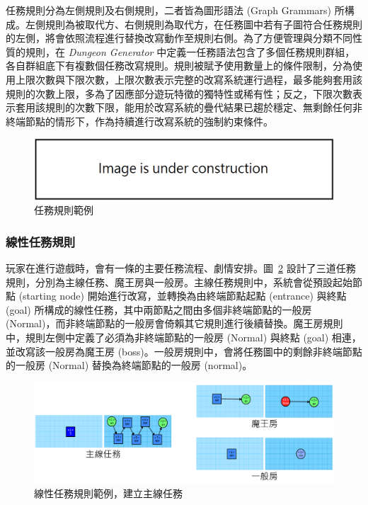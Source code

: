 任務規則分為左側規則及右側規則，二者皆為圖形語法 (Graph Grammars) 所構成。左側規則為被取代方、右側規則為取代方，在任務圖中若有子圖符合任務規則的左側，將會依照流程進行替換改寫動作至規則右側。為了方便管理與分類不同性質的規則，在 \textit{Dungeon Generator} 中定義一任務語法包含了多個任務規則群組，各自群組底下有複數個任務改寫規則。規則被賦予使用數量上的條件限制，分為使用上限次數與下限次數，上限次數表示完整的改寫系統運行過程，最多能夠套用該規則的次數上限，多為了因應部分遊玩特徵的獨特性或稀有性；反之，下限次數表示套用該規則的次數下限，能用於改寫系統的疊代結果已趨於穩定、無剩餘任何非終端節點的情形下，作為持續進行改寫系統的強制約束條件。

\begin{figure}[ht]
  \begin{center}
    \includegraphics[width=1.0\textwidth]{figures/under_construction.png}
    \caption{任務規則範例}
    \label{fig:missiongrammars-tutorial}
  \end{center}
\end{figure}

\subsubsection{線性任務規則}
\label{sssec:method-missiongrammars-rules-linearrules}

玩家在進行遊戲時，會有一條的主要任務流程、劇情安排。圖~\ref{fig:missiongrammars-rules-linear-example} 設計了三道任務規則，分別為主線任務、魔王房與一般房。主線任務規則中，系統會從預設起始節點 (starting node) 開始進行改寫，並轉換為由終端節點起點 (entrance) 與終點 (goal) 所構成的線性任務，其中兩節點之間由多個非終端節點的一般房 (Normal)，而非終端節點的一般房會倚賴其它規則進行後續替換。魔王房規則中，規則左側中定義了必須為非終端節點的一般房 (Normal) 與終點 (goal) 相連，並改寫該一般房為魔王房 (boss)。一般房規則中，會將任務圖中的剩餘非終端節點的一般房 (Normal) 替換為終端節點的一般房 (normal)。

\begin{figure}[ht]
  \begin{center}
    \includegraphics[width=1.0\textwidth]{figures/missiongrammars-rules-linear-example.png}
    \caption{線性任務規則範例，建立主線任務}
    \label{fig:missiongrammars-rules-linear-example}
  \end{center}
\end{figure}

